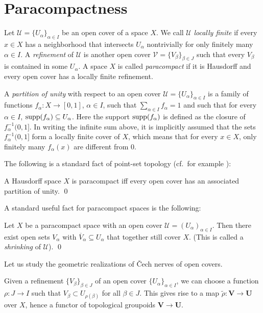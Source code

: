 \documentclass[a4paper,openany]{scrbook}
\begin{document}
\section{Paracompactness}\label{sec:paracompactness}

\begin{defn}
Let $\mathcal U = \{U_\alpha\}_{\alpha \in I}$ be an open cover of a space $X$. We call $\mathcal U$ \emph{locally finite} if every $x \in X$ has a neighborhood that intersects $U_\alpha$ nontrivially for only finitely many $\alpha \in I$. A \emph{refinement} of $\mathcal U$ is another open cover $\mathcal V = \{V_\beta\}_{\beta \in J}$ such that every $V_\beta$ is contained in some $U_\alpha$. A space $X$ is called \emph{paracompact} if it is Hausdorff and every open cover has a locally finite refinement.

A \emph{partition of unity} with respect to an open cover $\mathcal U=\{U_\alpha\}_{\alpha \in I}$ is a family of functions $f_\alpha\colon X \to [0,1]$, $\alpha \in I$, such that $\sum_{\alpha \in I} f_{\alpha} = 1$ and such that for every $\alpha \in I$, $\operatorname{supp}(f_\alpha) \subseteq U_\alpha$. Here the support $\operatorname{supp}(f_\alpha)$ is defined as the closure of $f_\alpha^{-1}(0,1]$. In writing the infinite sum above, it is implicitly assumed that the sets $f_{\alpha}^{-1}(0,1]$ form a locally finite cover of $X$, which means that for every $x \in X$, only finitely many $f_\alpha(x)$ are different from $0$.
\end{defn}

The following is a standard fact of point-set topology (cf.\ for example \cite[Chapter~I.12]{bredon:topology-geometry}):

\begin{prop}
A Hausdorff space $X$ is paracompact iff every open cover has an associated partition of unity. \qed
\end{prop}

A standard useful fact for paracompact spaces is the following:
\begin{prop}\label{prop:shrinking}
Let $X$ be a paracompact space with an open cover $\mathcal U = (U_\alpha)_{\alpha \in I}$. Then there exist open sets $V_\alpha$ with $\overline V_\alpha \subseteq U_\alpha$ that together still cover $X$. (This is called a \emph{shrinking} of $\mathcal U$). \qed
\end{prop}

Let us study the geometric realizations of \v Cech nerves of open covers. 

Given a refinement $\{V_\beta\}_{\beta \in J}$ of an open cover $\{U_\alpha\}_{\alpha \in I}$, we can choose a function $\rho\colon J \to I$ such that $V_\beta \subset U_{\rho(\beta)}$ for all $\beta \in J$. This gives rise to a map $\tilde \rho\colon \mathbf V \to \mathbf U$ over $X$, hence a functor of topological groupoids $\mathbf V \to \mathbf U$.
\end{document}
